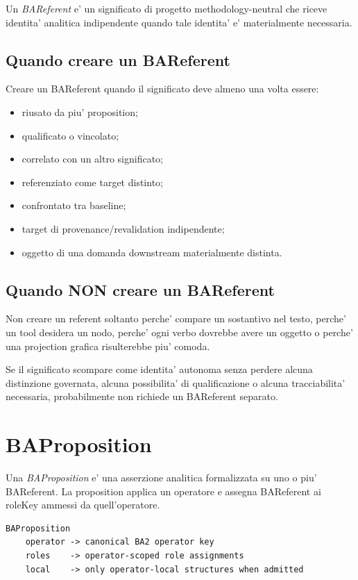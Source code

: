 \documentclass[11pt,a4paper]{article}
\providecommand{\BAR}{\textit{BAReferent}}
\providecommand{\BAP}{\textit{BAProposition}}
\providecommand{\stabletag}{\ddtatag{DDTAGreen}{CURRENT / PRESERVED}}
\begin{document}
Un \BAR{} e' un significato di progetto methodology-neutral che riceve identita' analitica indipendente quando tale identita' e' materialmente necessaria.

\subsection{Quando creare un BAReferent}
Creare un BAReferent quando il significato deve almeno una volta essere:
\begin{itemize}
  \item riusato da piu' proposition;
  \item qualificato o vincolato;
  \item correlato con un altro significato;
  \item referenziato come target distinto;
  \item confrontato tra baseline;
  \item target di provenance/revalidation indipendente;
  \item oggetto di una domanda downstream materialmente distinta.
\end{itemize}

\subsection{Quando NON creare un BAReferent}
Non creare un referent soltanto perche' compare un sostantivo nel testo, perche' un tool desidera un nodo, perche' ogni verbo dovrebbe avere un oggetto o perche' una projection grafica risulterebbe piu' comoda.

\begin{ddtacore}[title={Identity test}]
Se il significato scompare come identita' autonoma senza perdere alcuna distinzione governata, alcuna possibilita' di qualificazione o alcuna tracciabilita' necessaria, probabilmente non richiede un BAReferent separato.
\end{ddtacore}

\section{BAProposition}
\stabletag

Una \BAP{} e' una asserzione analitica formalizzata su uno o piu' BAReferent. La proposition applica un operatore e assegna BAReferent ai roleKey ammessi da quell'operatore.

\begin{lstlisting}
BAProposition
    operator -> canonical BA2 operator key
    roles    -> operator-scoped role assignments
    local    -> only operator-local structures when admitted
\end{lstlisting}
\end{document}
